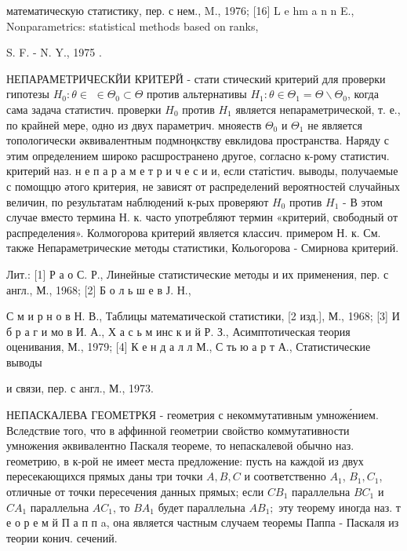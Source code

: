 \documentclass[10pt]{article}
\begin{document}
математическую статистику, пер. с нем., M., 1976; [16] L e hm a n n E., Nonparametrics: statistical methods based on ranks,

S. F. - N. Y., 1975 .



НЕПАРАМЕТРИЧЕСКЙИ КРИТЕРЙ - стати стический критерий для проверки гипотезы $H_{0}: \theta \in$ $\in \Theta_{0} \subset \Theta$ против альтернативы $H_{1}: \theta \in \Theta_{1}=\Theta \backslash \Theta_{0}$, когда сама задача статистич. проверки $H_{0}$ против $H_{1}$ является непараметрической, т. е., по крайней мере, одно из двух параметрич. мнояеств $\Theta_{0}$ и $\Theta_{1}$ не является топологически әквивалентным подмноңкству евклидова пространства. Наряду с этим определением широко расшространено другое, согласно к-рому статистич. критерий наз. н е п а р а м е т р и ч е с и и, если статістич. выводы, получаемые с помощцю әтого критерия, не зависят от распределений вероятностей случайных величин, по результатам наблюдений к-рых проверяют $H_{0}$ против $H_{1}$ - В этом случае вместо термина Н. к. часто употребляют термин «критерий, свободный от распределения». Колмогорова критерий является классич. примером Н. к. См. также Непараметрические методы статистики, Кольогорова - Смирнова критерий.



Лит.: [1] Р а о С. Р., Линейные статистические методы и их применения, пер. с англ., М., 1968; [2] Б о л ь ш е в Ј. Н.,

С м и р н о в Н. В., Таблицы математической статистики, [2 изд.], М., 1968; [3] И б р а г и мо в И. А., Х а с ь м инс к и й Р. З., Асимптотическая теория оценивания, М., 1979; [4] К е н д а л л М., С ть ю а р т А., Статистические выводы

и связи, пер. с англ., М., 1973.



НЕПАСКАЛЕВА ГЕОМЕТРКЯ - геометрия с некоммутативным умноже́нием. Вследствие того, что в аффинной геометрии свойство коммутативности умножения әквивалентно Паскаля теореме, то непаскалевой обычно наз. геометрию, в к-рой не имеет места предложение: пусть на каждой из двух пересекающихся прямых даны три точки $A, B, C$ и соответственно $A_{1}$, $B_{1}, C_{1}$, отличные от точки пересечения данных прямых; если $C B_{1}$ параллельна $B C_{1}$ и $C A_{1}$ параллельна $A C_{1}$, то $B A_{1}$ будет параллельна $A B_{1} ;$ эту теорему иногда наз. т е о р е м й П а п п a, она является частным случаем теоремы Паппа - Паскаля из теории конич. сечений.
\end{document}
